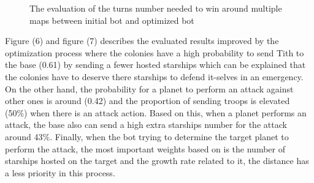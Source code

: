 \documentclass[]{interact}
\theoremstyle{plain}%
\theoremstyle{definition}
\theoremstyle{remark}
\begin{document}
\begin{figure}
\begin{center}
\end{center}
\caption{The evaluation of the turns number needed to win around multiple maps between initial bot and optimized bot}
\end{figure}



Figure (6) and figure (7) describes the evaluated results improved by the optimization process where the colonies have a high probability to send Tith to the base (0.61) by sending a fewer hosted starships which can be explained that the colonies have to deserve there starships to defend it-selves in an emergency. On the other hand, the probability for a planet to perform an attack against other ones is around (0.42) and the proportion of sending troops is elevated (50\%) when there is an attack action. Based on this, when a planet performs an attack, the base also can send a high extra starships number for the attack around 43\%. Finally, when the bot trying to determine the target planet to perform the attack, the most important weights based on is the number of starships hosted on the target and the growth rate related to it, the distance has a less priority in this process. \\

\end{document}
